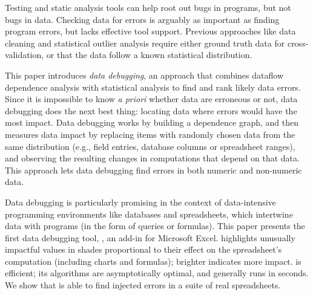 Testing and static analysis tools can help root out bugs in programs,
but not bugs in data. Checking data for errors is arguably as
important as finding program errors, but lacks effective tool
support. Previous approaches like data cleaning and statistical
outlier analysis require either ground truth data for
cross-validation, or that the data follow a known statistical
distribution.

This paper introduces \emph{data debugging}, an approach that
combines dataflow dependence analysis with statistical analysis to
find and rank likely data errors. Since it is impossible to
know \emph{a priori} whether data are erroneous or not, data debugging
does the next best thing: locating data where errors would have the
most impact. Data debugging works by building a dependence graph, and
then measures data impact by replacing items with randomly chosen data
from the same distribution (e.g., field entries, database columns or
spreadsheet ranges), and observing the resulting changes in
computations that depend on that data. This approach lets data
debugging find errors in both numeric and non-numeric data.

Data debugging is particularly promising in the context of
data-intensive programming environments like databases and
spreadsheets, which intertwine data with programs (in the form of
queries or formulas). This paper presents the first data debugging
tool, \checkcell{}, an add-in for Microsoft Excel. \checkcell{}
highlights unusually impactful values in shades proportional to their
effect on the spreadsheet's computation (including charts and
formulas); brighter indicates more impact. \checkcell{} is efficient;
its algorithms are asymptotically optimal, and generally runs in
seconds. We show that \checkcell{} is able to find injected errors in
a suite of real spreadsheets.

